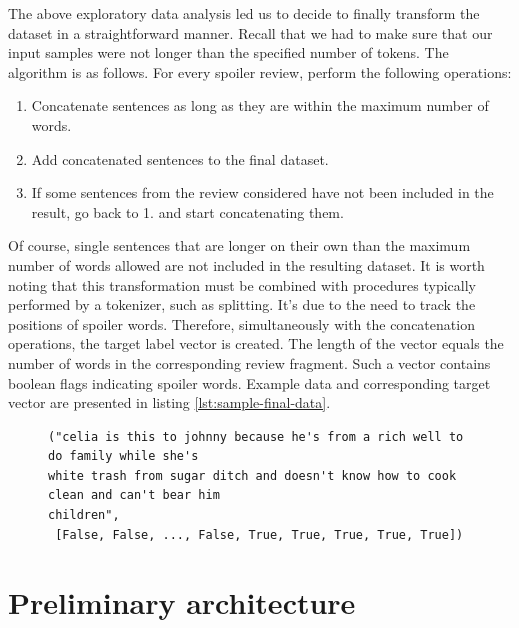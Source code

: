 \documentclass[11pt]{article}
\begin{document}
The above exploratory data analysis led us to decide to finally transform the dataset in a straightforward manner. Recall that we had to make sure that our input samples were not longer than the specified number of tokens. The algorithm is as follows. For every spoiler review, perform the following operations:
\begin{enumerate}
\item Concatenate sentences as long as they are within the maximum number of words.
\item Add concatenated sentences to the final dataset.
\item If some sentences from the review considered have not been included in the result, go back to 1. and start concatenating them.
\end{enumerate}
Of course, single sentences that are longer on their own than the maximum number of words allowed are not included in the resulting dataset. It is worth noting that this transformation must be combined with procedures typically performed by a tokenizer, such as splitting. It's due to the need to track the positions of spoiler words. Therefore, simultaneously with the concatenation operations, the target label vector is created. The length of the vector equals the number of words in the corresponding review fragment. Such a vector contains boolean flags indicating spoiler words. Example data and corresponding target vector are presented in listing \ref{lst:sample-final-data}. 

\begin{figure}[t]
\begin{lstlisting}[basicstyle=\small,caption={Sample element of the dataset adjusted to our needs. The maximum number of tokens was 64. Note that the text has already undergone preprocessing, e.g., punctuation removal. The target vector is a boolean vector indicating spoiler words. In this case, \textit{and can't bear him children} was annotated as a spoiler phrase.},label={lst:sample-final-data}]
("celia is this to johnny because he's from a rich well to do family while she's
white trash from sugar ditch and doesn't know how to cook clean and can't bear him
children",
 [False, False, ..., False, True, True, True, True, True])
\end{lstlisting}
\end{figure}


\section{Preliminary architecture} \label{preliminary-model}
\end{document}

